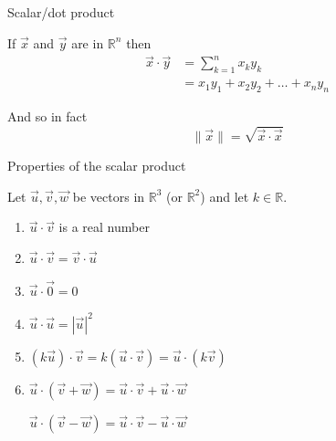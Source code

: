 \documentclass{beamer}
\begin{document}
\begin{frame}{Scalar/dot product}
  \begin{definition}
    If $\vec{x}$ and $\vec{y}$ are in $\mathbb R^n$ then
    \begin{align*}
      \vec{x}\cdot\vec{y} &= \sum_{k=1}^n x_ky_k\\
                          &= x_1y_1+x_2y_2+\dots +x_ny_n
    \end{align*}
  \end{definition}\vfill
  And so in fact
  \begin{equation*}
    \|\vec{x}\| = \sqrt{\vec{x}\cdot\vec{x}}
  \end{equation*}
\end{frame}

\begin{frame}{Properties of the scalar product}
  \begin{theorem}
    Let $\vec{u}, \vec{v}, \vec{w}$ be vectors in $\mathbb R^3$ 
    (or $\mathbb R^2$) and let $k\in \mathbb R$.
    \begin{enumerate}
    \item $\vec{u}\cdot\vec{v}$ is a real number
    \item $\vec{u}\cdot\vec{v}=\vec{v}\cdot\vec{u}$
    \item $\vec{u}\cdot\vec{0}=0$
    \item $\vec{u}\cdot\vec{u}=\left|\vec{u}\right|^2$
    \item $(k\vec{u})\cdot\vec{v}=
k(\vec{u}\cdot\vec{v})=
\vec{u}\cdot(k\vec{v})$
\item $\vec{u}\cdot(\vec{v} + \vec{w}) =
\vec{u}\cdot\vec{v} + \vec{u}\cdot\vec{w}$

$\vec{u}\cdot(\vec{v} - \vec{w}) =
\vec{u}\cdot\vec{v} - \vec{u}\cdot\vec{w}$
\end{enumerate}
\end{theorem}
\end{frame}
\end{document}
